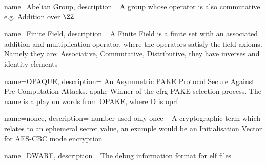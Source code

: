  {
  name={Abelian Group},
  description={
    A group whose operator is also commutative. e.g. Addition over $\ZZ$%
  }
}

 {
  name={Finite Field},
  description={
    A Finite Field is a finite set with an associated addition and multiplication operator, where the operators satisfy the field axioms. Namely they are: Associative, Commutative, Distributive, they have inverses and identity elements%
  }
}

 {
  name={OPAQUE},
  description={
    An Asymmetric PAKE Protocol Secure Against Pre-Computation Attacks.
    \gls{apake} Winner of the \gls{cfrg} PAKE selection process.
    The name is a play on words from OPAKE, where O is \gls{oprf}%
  }
}

 {
  name={nonce},
  description={
    number used only once -- A cryptographic term which relates to an ephemeral secret value, an example would be an Initialisation Vector for AES-CBC mode encryption%
  }
}

 {
  name={DWARF},
  description={
    The debug information format for \gls{elf} files%
  }
}

